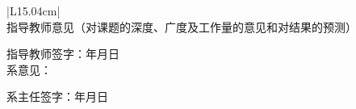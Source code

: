 \documentclass[a4paper,zihao=-4,fontset=fandol]{ctexart}
\begin{document}
{\songti
\begin{center}
\begin{tabular}{|L{15.04cm}|}
\hline
指导教师意见（对课题的深度、广度及工作量的意见和对结果的预测）\par
\vspace{6.0cm}
\hfill 指导教师签字：\hspace{3.5cm}年\hspace{0.7cm}月\hspace{0.7cm}日 \\
\hline
系意见：\par
\vspace{5.0cm}
\hfill 系主任签字：\hspace{3.5cm}年\hspace{0.7cm}月\hspace{0.7cm}日 \\
\hline
\end{tabular}
\end{center}
}
\end{document}
